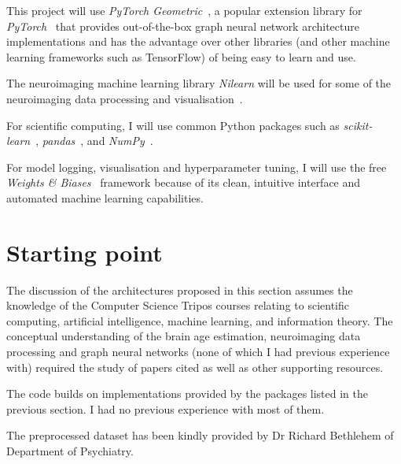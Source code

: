 This project will use \textit{PyTorch Geometric}~\cite{fey2019pytorch}, a popular extension library for \textit{PyTorch}~\cite{pytorch} that provides out-of-the-box graph neural network architecture implementations and has the advantage over other libraries (and other machine learning frameworks such as TensorFlow) of being easy to learn and use. 

The neuroimaging machine learning library \textit{Nilearn} will be used for some of the neuroimaging data processing and visualisation~\cite{abraham2014machine, nilearn}.

For scientific computing, I will use common Python packages such as \textit{scikit-learn}~\cite{pedregosa2011scikit}, \textit{pandas}~\cite{mckinney2010scipy}, and \textit{NumPy}~\cite{walt2011numpy}. 

For model logging, visualisation and hyperparameter tuning, I will use the free \textit{Weights \& Biases}~\cite{wandb} framework because of its clean, intuitive interface and automated machine learning capabilities.


\section{Starting point}
The discussion of the architectures proposed in this section assumes the knowledge of the Computer Science Tripos courses relating to scientific computing, artificial intelligence, machine learning, and information theory. The conceptual understanding of the brain age estimation, neuroimaging data processing and graph neural networks (none of which I had previous experience with) required the study of papers cited as well as other supporting resources.

The code builds on implementations provided by the packages listed in the previous section. I had no previous experience with most of them.

The preprocessed dataset has been kindly provided by Dr Richard Bethlehem of Department of Psychiatry.